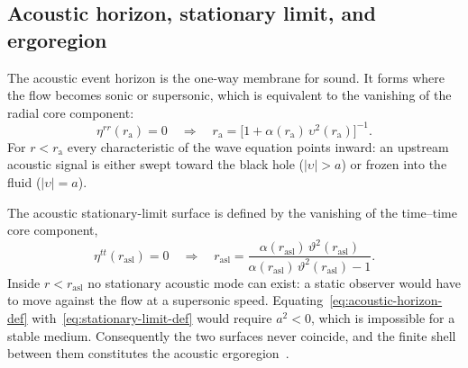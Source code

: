 \documentclass[12pt,a4paper,preprint]{elsarticle}
\begin{document}
        \subsection{Acoustic horizon, stationary limit, and ergoregion}\label{subsec:causal-surfaces}

            The acoustic event horizon is the one-way membrane for sound. It forms where the flow becomes sonic or supersonic, which is equivalent to the vanishing of the radial core component:
            \begin{equation}
                \eta^{rr}(r_{\mathrm{a}}) = 0 \quad \Longrightarrow \quad r_{\mathrm{a}} = \bigl[1 + \alpha(r_{\mathrm{a}})\,\upsilon^{2}(r_{\mathrm{a}})\bigr]^{-1} .
                \label{eq:acoustic-horizon-def}
            \end{equation}
            For $r<r_{\mathrm{a}}$ every characteristic of the wave equation points inward: an upstream acoustic signal is either swept toward the black hole ($|\upsilon|>a$) or frozen into the fluid ($|\upsilon|=a$).

            The acoustic stationary-limit surface is defined by the vanishing of the time--time core component,
            \begin{equation}
                \eta^{tt}(r_{\mathrm{asl}}) = 0 \quad \Longrightarrow \quad r_{\mathrm{asl}} = \frac{\alpha(r_{\mathrm{asl}})\,\vartheta^{2}(r_{\mathrm{asl}})} {\alpha(r_{\mathrm{asl}})\,\vartheta^{2}(r_{\mathrm{asl}})-1} .
                \label{eq:stationary-limit-def}
            \end{equation}
            Inside $r<r_{\mathrm{asl}}$ no stationary acoustic mode can exist: a static observer would have to move against the flow at a supersonic speed. Equating~\eqref{eq:acoustic-horizon-def} with~\eqref{eq:stationary-limit-def} would require $a^{2}<0$, which is impossible for a stable medium. Consequently the two surfaces never coincide, and the finite shell between them constitutes the acoustic ergoregion~\cite{VisserM_AcousticBlackHolesHorizonsErgospheresAndHawkingRadiation_1998, BilicN_RelativisticAcousticGeometry_1999}.
\end{document}
